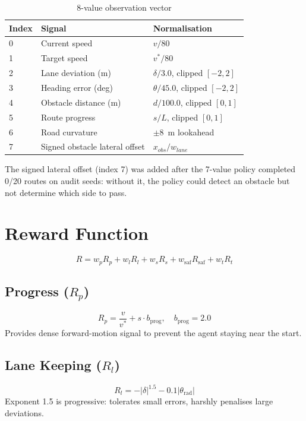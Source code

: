 \documentclass[12pt,a4paper]{report}
\begin{document}
\begin{table}[H]
\centering
\caption{8-value observation vector}
\label{tab:obs}
\begin{tabular}{lll}
\toprule
Index & Signal & Normalisation \\
\midrule
0 & Current speed & $v / 80$ \\
1 & Target speed & $v^* / 80$ \\
2 & Lane deviation (m) & $\delta / 3.0$, clipped $[-2, 2]$ \\
3 & Heading error (deg) & $\theta / 45.0$, clipped $[-2, 2]$ \\
4 & Obstacle distance (m) & $d / 100.0$, clipped $[0, 1]$ \\
5 & Route progress & $s / L$, clipped $[0, 1]$ \\
6 & Road curvature & $\pm 8$~m lookahead \\
7 & Signed obstacle lateral offset & $x_{obs} / w_{lane}$ \\
\bottomrule
\end{tabular}
\end{table}

The signed lateral offset (index 7) was added after the 7-value policy completed 0/20 routes on audit seeds: without it, the policy could detect an obstacle but not determine which side to pass.

\section{Reward Function}

\begin{equation}
R = w_p R_p + w_l R_l + w_s R_s + w_{\text{saf}} R_{\text{saf}} + w_t R_t
\end{equation}

\subsection{Progress ($R_p$)}
\begin{equation}
R_p = \frac{v}{v^*} + s \cdot b_{\text{prog}}, \quad b_{\text{prog}} = 2.0
\end{equation}
Provides dense forward-motion signal to prevent the agent staying near the start.

\subsection{Lane Keeping ($R_l$)}
\begin{equation}
R_l = -|\delta|^{1.5} - 0.1|\theta_{\text{rad}}|
\end{equation}
Exponent 1.5 is progressive: tolerates small errors, harshly penalises large deviations.
\end{document}
